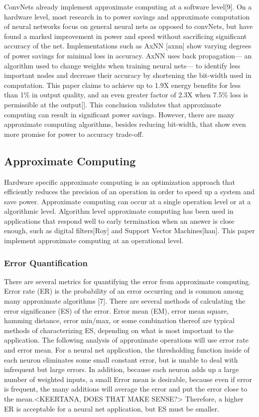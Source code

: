 \documentclass[conference]{IEEEtran}
\begin{document}
	\indent ConvNets already implement approximate computing at a software level[9]. On a hardware level, most research in to power savings and approximate computation of neural networks focus on general neural nets as opposed to convNets, but have found a marked improvement in power and speed without sacrificing significant accuracy of the net. Implementations such as AxNN [axnn] show varying degrees of power savings for minimal loss in accuracy. AxNN uses back propagation--- an algorithm used to change weights when training neural nets--- to identify less important nodes and decrease their accuracy by shortening the bit-width used in computation. This paper claims to achieve up to 1.9X energy benefits for less than 1\% in output quality, and an even greater factor of 2.3X when 7.5\% loss is permissible at the output[]. This conclusion validates that approximate computing can result in significant power savings. However, there are many approximate computing algorithms, besides reducing bit-width, that show even more promise for power to accuracy trade-off.\\
	

\subsection{Approximate Computing}

	\indent Hardware specific approximate computing is an optimization approach that efficiently reduces the precision of an operation in order to speed up a system and save power. Approximate computing can occur at a single operation level or at a algorithmic level. Algorithm level approximate computing has been used in applications that respond well to early termination when an answer is close enough, such as digital filters[Roy] and Support Vector Machines[han]. This paper implement approximate computing at an operational level.\\
	
	\subsubsection{Error Quantification}
	\indent 	There are several metrics for quantifying the error from approximate computing. Error rate (ER) is the probability of an error occurring and is common among many approximate algorithms [7]. There are several methods of calculating the error significance (ES) of the error. Error mean (EM), error mean square, hamming distance, error min/max, or some combination thereof are typical methods of characterizing ES, depending on what is most important to the application. The following analysis of approximate operations will use error rate and error mean. For a neural net application, the thresholding function inside of each neuron eliminates some small constant error, but is unable to deal with infrequent but large errors. In addition, because each neuron adds up a large number of weighted inputs, a small Error mean is desirable, because even if error is frequent, the many additions will average the error and put the error close to the mean.<KEERTANA, DOES THAT MAKE SENSE?>  Therefore, a higher ER is acceptable for a neural net application, but ES must be smaller. \\	
	
\end{document}
